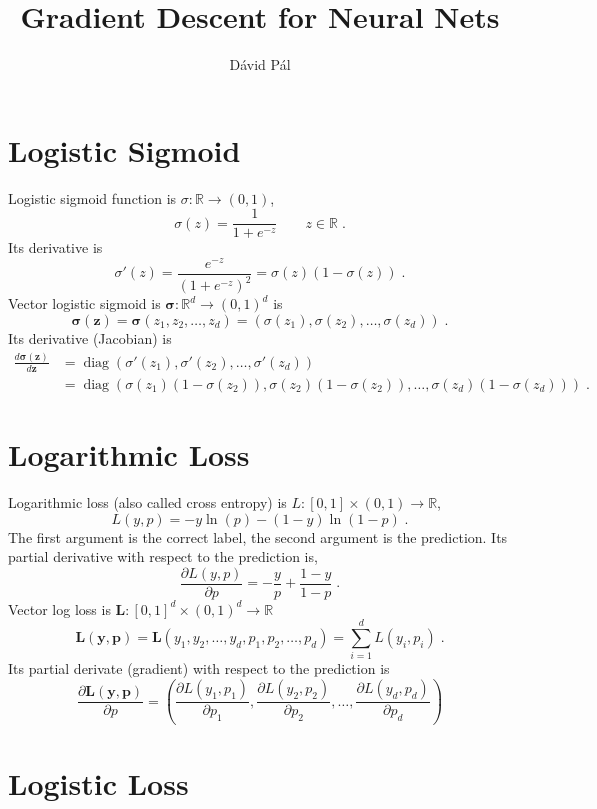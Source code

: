 \documentclass[12pt]{article}
\title{Gradient Descent for Neural Nets}
\author{D\'avid P\'al}
\DeclareMathOperator{\diag}{diag}
\newcommand{\R}{\mathbb{R}}
\newcommand{\bsigma}{\pmb{\sigma}}
\newcommand{\y}{\mathbf{y}}
\newcommand{\p}{\mathbf{p}}
\newcommand{\z}{\mathbf{z}}
\renewcommand{\L}{\mathbf{L}}
\begin{document}
\maketitle

\section{Logistic Sigmoid}

Logistic sigmoid function is $\sigma:\R \to (0,1)$,
$$
\sigma(z) = \frac{1}{1 + e^{-z}} \qquad z \in \R \; .
$$
Its derivative is
$$
\sigma'(z) = \frac{e^{-z}}{(1 + e^{-z})^2} = \sigma(z) (1 - \sigma(z)) \; .
$$
Vector logistic sigmoid is $\bsigma:\R^d \to (0,1)^d$ is
$$
\bsigma(\z) = \bsigma(z_1, z_2, \dots, z_d) = (\sigma(z_1), \sigma(z_2), \dots, \sigma(z_d)) \; .
$$
Its derivative (Jacobian) is
\begin{align*}
\frac{d \bsigma(\z)}{d\z}
& = \diag(\sigma'(z_1), \sigma'(z_2), \dots, \sigma'(z_d)) \\
& = \diag(\sigma(z_1) (1 - \sigma(z_2)), \sigma(z_2) (1 - \sigma(z_2)), \dots, \sigma(z_d) (1 - \sigma(z_d))) \; .
\end{align*}

\section{Logarithmic Loss}

Logarithmic loss (also called cross entropy) is $L:[0,1] \times (0,1) \to \R$,
$$
L(y,p) = - y \ln(p) - (1-y) \ln(1-p) \; .
$$
The first argument is the correct label, the second argument
is the prediction. Its partial derivative with respect to the prediction is,
$$
\frac{\partial L(y,p)}{\partial p} = - \frac{y}{p} + \frac{1-y}{1-p} \; .
$$
Vector log loss is $\L:[0,1]^d \times (0,1)^d \to \R$
$$
\L(\y,\p) = \L(y_1, y_2, \dots, y_d, p_1, p_2, \dots, p_d) = \sum_{i=1}^d L(y_i, p_i) \; .
$$
Its partial derivate (gradient) with respect to the prediction is
$$
\frac{\partial \L(\y, \p)}{\partial p}
= \left(\frac{\partial L(y_1,p_1)}{\partial p_1}, \frac{\partial L(y_2,p_2)}{\partial p_2}, \dots, \frac{\partial L(y_d,p_d)}{\partial p_d} \right)
$$

\section{Logistic Loss}
\end{document}
